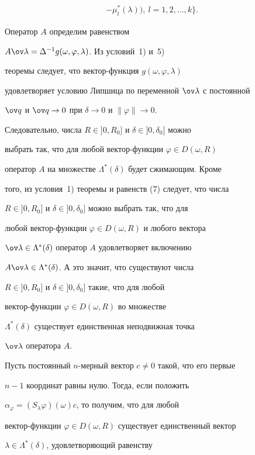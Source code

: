\begin{pf}
\begin{multline*}
-\mu^*_l(\lambda)),\ l=1,2,\dotsc,k\bigg\}. 


\end{multline*} 


 


Оператор $A$ определим равенством 


$A\ov\lambda=\Delta^{-1}g(\omega,\varphi,\lambda)$. Из условий~1) и~5) 


теоремы следует, что вектор-функция $g(\omega,\varphi,\lambda)$ 


удовлетворяет условию Липшица по переменной $\ov\lambda$ с постоянной 


$\ov q$ и $\ov q\to 0$ при $\delta\to0$ и $\|\varphi\|\to0$. 


Следовательно, числа $R\in]0,R_0]$ и $\delta\in]0,\delta_0]$ можно 


выбрать так, что для любой вектор-функции $\varphi\in D(\omega,R)$ 


оператор $A$ на множестве $\Lambda^*(\delta)$ будет сжимающим. Кроме 


того, из условия~1) теоремы и равенств (7) следует, что числа 


$R\in]0,R_0]$ и $\delta\in]0,\delta_0]$ можно выбрать так, что для 


любой вектор-функции $\varphi\in D(\omega,R)$ и любого вектора 


$\ov\lambda\in\Lambda^*(\delta)$ оператор $A$ удовлетворяет включению 


$A\ov\lambda\in\Lambda^*(\delta)$. А это значит, что существуют числа 


$R\in]0,R_0]$ и $\delta\in]0,\delta_0]$ такие, что для любой 


вектор-функции $\varphi\in D(\omega,R)$ во множестве 


$\Lambda^*(\delta)$ существует единственная неподвижная точка 


$\ov\lambda$ оператора $A$. 


 


Пусть постоянный $n$-мерный вектор $c\ne0$ такой, что его первые 


$n{-}1$ координат равны нулю. Тогда, если положить 


$\alpha_\varphi=(S_\lambda\varphi)(\omega)c$, то получим, что для любой 


вектор-функции $\varphi\in D(\omega,R)$ существует единственный вектор 


$\lambda\in\Lambda^*(\delta)$, удовлетворяющий равенству 



\end{pf}

